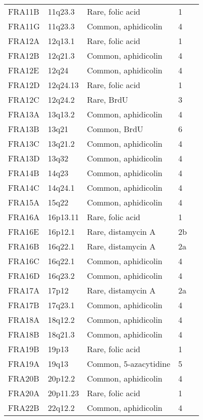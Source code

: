 \documentclass[phd,tocprelim]{cornell}
\begin{document}
\begin{table}
\begin{tabular}{l*{4}{l}}
     FRA11B & 11q23.3  & Rare, folic acid    & 1 \\
     FRA11G & 11q23.3  & Common, aphidicolin   & 4 \\
     FRA12A & 12q13.1  & Rare, folic acid    & 1 \\
     FRA12B & 12q21.3  & Common, aphidicolin   & 4 \\
     FRA12E & 12q24    & Common, aphidicolin   & 4 \\
     FRA12D & 12q24.13 & Rare, folic acid    & 1 \\
     FRA12C & 12q24.2  & Rare, BrdU          & 3 \\
     FRA13A & 13q13.2  & Common, aphidicolin   & 4 \\
     FRA13B & 13q21    & Common, BrdU          & 6 \\
     FRA13C & 13q21.2  & Common, aphidicolin   & 4 \\
     FRA13D & 13q32    & Common, aphidicolin   & 4 \\
     FRA14B & 14q23    & Common, aphidicolin   & 4 \\
     FRA14C & 14q24.1  & Common, aphidicolin   & 4 \\
     FRA15A & 15q22    & Common, aphidicolin   & 4 \\
     FRA16A & 16p13.11 & Rare, folic acid    & 1 \\
     FRA16E & 16p12.1  & Rare, distamycin A  & 2b \\
     FRA16B & 16q22.1  & Rare, distamycin A  & 2a \\
     FRA16C & 16q22.1  & Common, aphidicolin   & 4 \\
     FRA16D & 16q23.2  & Common, aphidicolin   & 4 \\
     FRA17A & 17p12    & Rare, distamycin A  & 2a \\
     FRA17B & 17q23.1  & Common, aphidicolin   & 4 \\
     FRA18A & 18q12.2  & Common, aphidicolin   & 4 \\
     FRA18B & 18q21.3  & Common, aphidicolin   & 4 \\
     FRA19B & 19p13    & Rare, folic acid    & 1 \\
     FRA19A & 19q13    & Common, 5-azacytidine & 5 \\
     FRA20B & 20p12.2  & Common, aphidicolin   & 4 \\
     FRA20A & 20p11.23 & Rare, folic acid    & 1 \\
     FRA22B & 22q12.2  & Common, aphidicolin   & 4 \\

\end{tabular}
\end{table}
\end{document}
